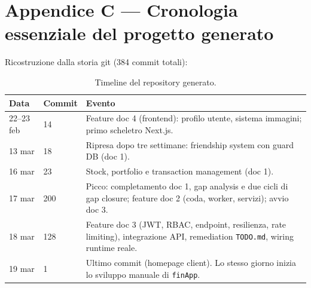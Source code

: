 \documentclass[11pt,a4paper]{article}
\newcommand{\file}[1]{\texttt{\small #1}}
\begin{document}
\section{Appendice C --- Cronologia essenziale del progetto generato}

Ricostruzione dalla storia git (384 commit totali):

\begin{table}[H]
\centering
\small
\begin{tabular}{llp{8.5cm}}
\toprule
\textbf{Data} & \textbf{Commit} & \textbf{Evento} \\
\midrule
22--23 feb & 14 & Feature doc 4 (frontend): profilo utente, sistema immagini; primo scheletro Next.js. \\
13 mar & 18 & Ripresa dopo tre settimane: friendship system con guard DB (doc 1). \\
16 mar & 23 & Stock, portfolio e transaction management (doc 1). \\
17 mar & 200 & Picco: completamento doc 1, gap analysis e due cicli di gap closure; feature doc 2 (coda, worker, servizi); avvio doc 3. \\
18 mar & 128 & Feature doc 3 (JWT, RBAC, endpoint, resilienza, rate limiting), integrazione API, remediation \file{TODO.md}, wiring runtime reale. \\
19 mar & 1 & Ultimo commit (homepage client). Lo stesso giorno inizia lo sviluppo manuale di \file{finApp}. \\
\bottomrule
\end{tabular}
\caption{Timeline del repository generato.}
\end{table}
\end{document}
